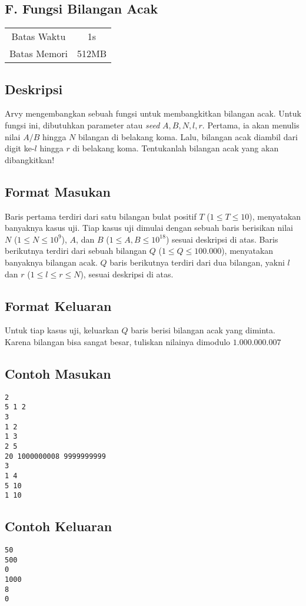 \documentclass{article}
\begin{document}
\begin{center}
    \section*{F. Fungsi Bilangan Acak}

    \begin{tabular}{ | c c | }
        \hline
        Batas Waktu  & 1s \\
        Batas Memori & 512MB \\
        \hline
    \end{tabular}
\end{center}

\subsection*{Deskripsi}

Arvy mengembangkan sebuah fungsi untuk membangkitkan bilangan acak.
Untuk fungsi ini, dibutuhkan parameter atau \textit{seed} $A, B, N, l, r$.
Pertama, ia akan menulis nilai $A / B$ hingga $N$ bilangan di belakang koma.
Lalu, bilangan acak diambil dari digit ke-$l$ hingga $r$ di belakang koma.
Tentukanlah bilangan acak yang akan dibangkitkan!

\subsection*{Format Masukan}
Baris pertama terdiri dari satu bilangan bulat positif $T$ ($1 \leq T \leq 10$), menyatakan banyaknya kasus uji.
Tiap kasus uji dimulai dengan sebuah baris berisikan nilai $N$ ($1 \leq N \leq 10^{9}$), $A$, dan $B$ ($1 \leq A, B \leq 10^{18}$) sesuai deskripsi di atas.
Baris berikutnya terdiri dari sebuah bilangan $Q$ ($1 \leq Q \leq 100.000$), menyatakan banyaknya bilangan acak.
$Q$ baris berikutnya terdiri dari dua bilangan, yakni $l$ dan $r$ ($1 \leq l \leq r \leq N$), sesuai deskripsi di atas.

\subsection*{Format Keluaran}
Untuk tiap kasus uji, keluarkan $Q$ baris berisi bilangan acak yang diminta. Karena bilangan bisa sangat besar, tuliskan nilainya dimodulo $1.000.000.007$

\begin{multicols}{2}
\subsection*{Contoh Masukan}
\begin{lstlisting}
2
5 1 2
3
1 2
1 3
2 5
20 1000000008 9999999999
3
1 4
5 10
1 10
\end{lstlisting}
\columnbreak
\subsection*{Contoh Keluaran}
\begin{lstlisting}
50
500
0
1000
8
0
\end{lstlisting}
\vfill
\null
\end{multicols}
\end{document}

